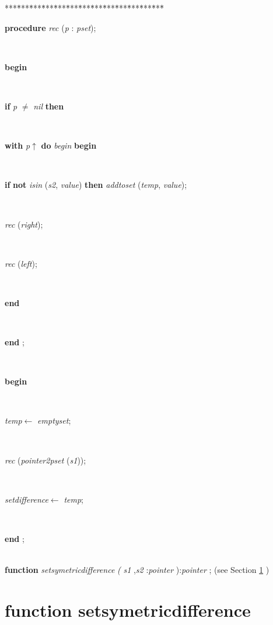 \documentclass[10pt, a4paper]{article}
\begin{document}
\begin{tabbing}
***\=***\=***\=***\=***\=***\=***\=***\=***\=***\=***\=***\=***\=\kill
\parbox{14cm}{\textsf {\textbf {procedure } \textsf{\textit{rec} (\textit{p} : \textit{pset})}; }}\\
\+\parbox{14cm}{\textsf{\textbf{begin} }}\\
\+\parbox{14cm}{\textsf {\textbf {if } \textsf{\textit{p} $\neq$ \textit{nil}} \textbf{ then } }}\\
\+\<\parbox{14cm}{\textsf {\textbf {with } \textsf{\textit{p}$\uparrow$\textit{}} \textbf{ do } \textsf{\textit{begin}} \textbf{ begin } }}\\
\parbox{14cm}{\textsf {\textbf {if } \textsf{\textbf{not} \textit{isin} (\textit{s2}, \textit{value}) } \textbf{ then } \textsf{\textit{addtoset} (\textit{temp}, \textit{value})}; }}\\
\parbox{14cm}{\textsf{\textit{rec} (\textit{right})}; }\\
\parbox{14cm}{\textsf{\textit{rec} (\textit{left})}; }\\
\<\-\parbox{14cm}{\textsf{\textbf{end} }}\\
\<\-\<\-\parbox{14cm}{\textsf{\textbf{end} ;}}\\
\+\parbox{14cm}{\textsf{\textbf{begin} }}\\
\parbox{14cm}{\textsf{\textit{temp}$\leftarrow$ \textit{emptyset}}; }\\
\parbox{14cm}{\textsf{\textit{rec} (\textit{pointer2pset} (\textit{s1}))}; }\\
\parbox{14cm}{\textsf{\textit{setdifference}$\leftarrow$ \textit{temp}}; }\\
\<\-\parbox{14cm}{\textsf{\textbf{end} ;}}\\
\+\textsf{\textbf{function}  \textit{setsymetricdifference} \textit{(} \textit{s1} ,\textit{s2} :\textit{pointer} ):\textit{pointer} ;} (see Section \ref{sec:genericset/pointer2pset/setle/setge/setequals/setdifference/recsetsymetricdifference} )\\
\end{tabbing}
\section{function setsymetricdifference}\label{sec:genericset/pointer2pset/setle/setge/setequals/setdifference/recsetsymetricdifference}
\end{document}
